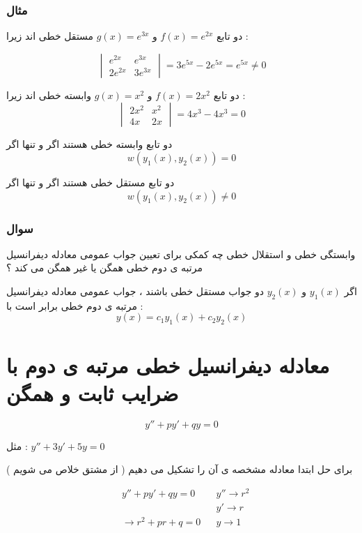 \documentclass[12pt]{book}
\begin{document}
\subsubsection{مثال}

دو تابع 
$f(x)= e^{2x}$
و
$g(x) = e^{3x}$
مستقل خطی اند زیرا :

$$
\begin{vmatrix}
e^{2x} & e^{3x} \\
2e^{2x} & 3e^{3x}
\end{vmatrix} = 3e^{5x} - 2e^{5x} = e^{5x} \neq 0
$$


دو تابع 
$f(x) = 2x^{2}$
و
$g(x) = x^{2}$
وابسته خطی اند زیرا :
$$
\begin{vmatrix}
2x^{2} & x^{2} \\
4x & 2x
\end{vmatrix} = 4x^{3} - 4x^{3} =  0
$$



\begin{tcolorbox}
دو تابع وابسته خطی هستند اگر و تنها اگر
$$
w( y_{1}(x) , y_{2}(x) ) = 0
$$
\end{tcolorbox}

\begin{tcolorbox}
دو تابع مستقل خطی هستند اگر و تنها اگر
$$
w( y_{1}(x) , y_{2}(x) ) \neq 0
$$
\end{tcolorbox}


\subsubsection{سوال}

وابستگی خطی و استقلال خطی چه کمکی برای تعیین جواب عمومی معادله دیفرانسیل مرتبه ی دوم خطی همگن یا غیر همگن می کند ؟

اگر
$y_{1}(x)$
و
$y_{2}(x)$
دو جواب مستقل خطی باشند ، جواب عمومی معادله دیفرانسیل مرتبه ی دوم خطی برابر است با :
$$
y(x) = c_{1}y_{1}(x) + c_{2}y_{2}(x)
$$



\section{معادله دیفرانسیل خطی مرتبه ی دوم با ضرایب ثابت و همگن}

$$
y'' + py' + qy = 0
$$

مثل : 
$y'' + 3y' + 5y = 0$

برای حل ابتدا معادله مشخصه ی آن را تشکیل می دهیم ( از مشتق خلاص می شویم )

\begin{align*}
&y'' + py' + qy = 0  & &y'' \to r^{2} \\
& & &y' \to r \\
&\to r^{2} + pr + q = 0 & &y \to 1\\
\end{align*}
\end{document}
